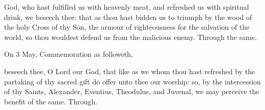 
\postcommunion
{} God, who hast fulfilled us with heavenly meat, and refreshed us with spiritual drink, we beseech thee: that as thou hast bidden us to triumph by the wood of the holy Cross of thy Son, the armour of righteousness for the salvation of the world, so thou wouldest defend us from the malicious enemy. Through the same.
\begin{rubric}
	 On 3 May, Commemoration  as followeth,
\end{rubric}
 beseech thee, O Lord our God, that like as we whom thou hast refreshed by the partaking of thy sacred gift do offer unto thee our worship: so, by the intercession of thy Saints, Alexander, Eventius, Theodulus, and Juvenal, we may perceive the benefit of the same. Through.


%
  
